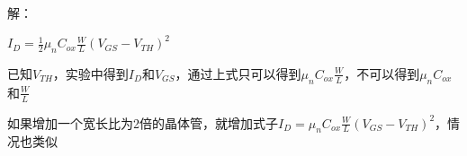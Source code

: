 






解：

$I_D=\frac{1}{2}\mu_nC_{ox}\frac{W}{L}(V_{GS}-V_{TH})^2$

已知$V_{TH}$，实验中得到$I_D$和$V_{GS}$，通过上式只可以得到$\mu_nC_{ox}\frac{W}{L}$，不可以得到$\mu_nC_{ox}$和$\frac{W}{L}$

如果增加一个宽长比为2倍的晶体管，就增加式子$I_D=\mu_nC_{ox}\frac{W}{L}(V_{GS}-V_{TH})^2$，情况也类似









